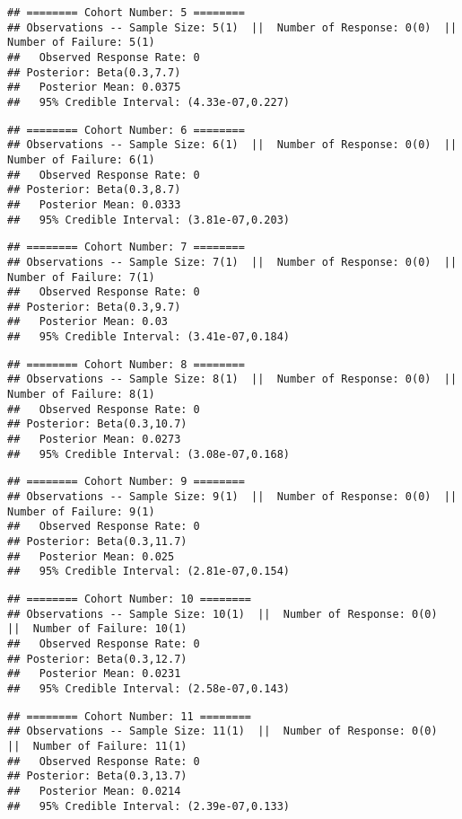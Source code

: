 \documentclass[]{article}
\begin{document}
\begin{verbatim}
## ======== Cohort Number: 5 ======== 
## Observations -- Sample Size: 5(1)  ||  Number of Response: 0(0)  ||  Number of Failure: 5(1)
##   Observed Response Rate: 0
## Posterior: Beta(0.3,7.7) 
##   Posterior Mean: 0.0375
##   95% Credible Interval: (4.33e-07,0.227)
\end{verbatim}

\begin{verbatim}
## ======== Cohort Number: 6 ======== 
## Observations -- Sample Size: 6(1)  ||  Number of Response: 0(0)  ||  Number of Failure: 6(1)
##   Observed Response Rate: 0
## Posterior: Beta(0.3,8.7) 
##   Posterior Mean: 0.0333
##   95% Credible Interval: (3.81e-07,0.203)
\end{verbatim}

\begin{verbatim}
## ======== Cohort Number: 7 ======== 
## Observations -- Sample Size: 7(1)  ||  Number of Response: 0(0)  ||  Number of Failure: 7(1)
##   Observed Response Rate: 0
## Posterior: Beta(0.3,9.7) 
##   Posterior Mean: 0.03
##   95% Credible Interval: (3.41e-07,0.184)
\end{verbatim}

\begin{verbatim}
## ======== Cohort Number: 8 ======== 
## Observations -- Sample Size: 8(1)  ||  Number of Response: 0(0)  ||  Number of Failure: 8(1)
##   Observed Response Rate: 0
## Posterior: Beta(0.3,10.7) 
##   Posterior Mean: 0.0273
##   95% Credible Interval: (3.08e-07,0.168)
\end{verbatim}

\begin{verbatim}
## ======== Cohort Number: 9 ======== 
## Observations -- Sample Size: 9(1)  ||  Number of Response: 0(0)  ||  Number of Failure: 9(1)
##   Observed Response Rate: 0
## Posterior: Beta(0.3,11.7) 
##   Posterior Mean: 0.025
##   95% Credible Interval: (2.81e-07,0.154)
\end{verbatim}

\begin{verbatim}
## ======== Cohort Number: 10 ======== 
## Observations -- Sample Size: 10(1)  ||  Number of Response: 0(0)  ||  Number of Failure: 10(1)
##   Observed Response Rate: 0
## Posterior: Beta(0.3,12.7) 
##   Posterior Mean: 0.0231
##   95% Credible Interval: (2.58e-07,0.143)
\end{verbatim}

\begin{verbatim}
## ======== Cohort Number: 11 ======== 
## Observations -- Sample Size: 11(1)  ||  Number of Response: 0(0)  ||  Number of Failure: 11(1)
##   Observed Response Rate: 0
## Posterior: Beta(0.3,13.7) 
##   Posterior Mean: 0.0214
##   95% Credible Interval: (2.39e-07,0.133)
\end{verbatim}
\end{document}
